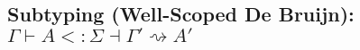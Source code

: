 \documentclass{article}
\begin{document}
\begin{comment}
\inferrule*[lab=S-Hole-Ex]
{ FV_{ex}(A) \neq . \\
\Gamma \vdash \square \Rightarrow e \Rightarrow C\\
\Gamma \vdash C <: A \dashv \Gamma_1 \rightsquigarrow A' \\
\Gamma_1 \vdash B <: \Sigma \dashv \Gamma_2 \rightsquigarrow D}
{\Gamma \vdash A \rightarrow B <: \boxed{e} \leadsto \Sigma \dashv \Gamma_2 \rightsquigarrow A' \rightarrow D}

\inferrule*[lab=S-All]
{\Gamma, a \vdash A <: B \dashv \Gamma', a\rightsquigarrow C}
{\Gamma \vdash \forall a. A <: \forall a. B \dashv \Gamma' \rightsquigarrow \forall a. C}

\inferrule*[lab=S-All-L]
{\Gamma, \hat{a} \vdash [\hat{a}/a]A <: \boxed{e} \leadsto \Sigma \dashv \Gamma', \hat{a} \rightsquigarrow B}
{\Gamma \vdash \forall a. A <: \boxed{e} \leadsto \Sigma \dashv \Gamma' \rightsquigarrow B}
\end{mathpar}
\end{comment}

\subsection{Subtyping (Well-Scoped De Bruijn): $\boxed{\Gamma \vdash A <: \Sigma \dashv \Gamma' \rightsquigarrow A'}$}
\end{document}
